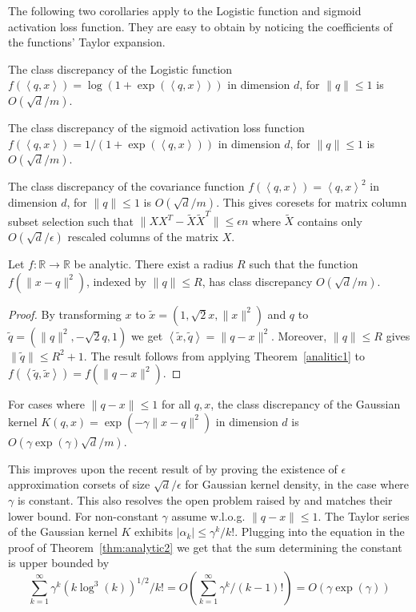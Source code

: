 \documentclass[12pt]{colt2019} %
\newcommand{\ip}[1]{\left \langle #1 \right \rangle}
\newcommand{\R}{\mathbb{R}}
\newcommand{\eps}{\epsilon}
\begin{document}
{The following two corollaries apply to the Logistic function and sigmoid activation loss function. They are easy to obtain by noticing the coefficients of the functions' Taylor expansion.

\begin{corollary}\label{cdlogistic}
The class discrepancy of the Logistic function $f(\ip{q,x}) = \log(1+\exp(\ip{q,x}))$ in dimension $d$, for $\|q\| \leq 1$ is $O(\sqrt{d}/m)$.
\end{corollary}
\begin{corollary}\label{cdsigmoid}
The class discrepancy of the sigmoid activation loss function $f(\ip{q,x}) = 1/(1+\exp(\ip{q,x}))$ in dimension $d$, for $\|q\| \leq 1$ is $O(\sqrt{d}/m)$.
\end{corollary}


\begin{corollary}
The class discrepancy of the covariance function $f(\ip{q,x}) = \ip{q,x}^2$ in dimension $d$, for $\|q\| \leq 1$ is $O(\sqrt{d}/m)$. This gives coresets for matrix column subset selection such that $\|XX^T - \tilde X \tilde X^T\| \le \eps n$ where $\tilde X$ contains only $O(\sqrt{d}/\eps)$ rescaled columns of the matrix $X$.
\end{corollary}



\begin{theorem} \label{thm:analytic2}
Let $f:\R\rightarrow\R$ be analytic. There exist a radius $R$ such that the function $f(\|x-q\|^2)$, indexed by $\|q\| \leq R$, has class discrepancy $O(\sqrt{d}/m)$. 
\end{theorem}
\begin{proof}
By transforming $x$ to $\tilde{x} = (1, \sqrt{2}x, \|x\|^2)$ and $q$ to $\tilde{q} = (\|q\|^2, -\sqrt{2}q, 1)$ we get $\ip{\tilde{x},\tilde{q}} = \|q-x\|^2$. Moreover, $\|q\| \le R$ gives $\|\tilde q\| \le R^2+1$. The result follows from applying Theorem~\ref{analitic1} to $f(\ip{ \tilde q, \tilde x}) = f(\|q-x\|^2)$.
\end{proof}

\begin{corollary}
For cases where $\|q-x\| \leq 1$ for all $q,x$, the class discrepancy of the Gaussian kernel $K(q,x) = \exp(-\gamma \|x-q\|^2)$ in dimension $d$ is $O(\gamma\exp(\gamma)\sqrt{d}/m)$.
\end{corollary} 
This improves upon the recent result of \cite{DBLP:journals/corr/abs-1802-01751} by proving the existence of $\eps$ approximation corsets of size $\sqrt{d}/\eps$ for Gaussian kernel density, in the case where $\gamma$ is constant. 
This also resolves the open problem raised by \cite{DBLP:journals/corr/abs-1802-01751} and matches their lower bound.   
For non-constant $\gamma$ assume w.l.o.g. $\|q-x\| \le 1$. The Taylor series of the Gaussian kernel $K$ exhibits $|\alpha_k| \le \gamma^k/k!$.
Plugging into the equation in the proof of Theorem~\ref{thm:analytic2} we get that the sum determining the constant is upper bounded by
$$\sum_{k=1}^\infty \gamma^{k}(k\log^3(k))^{1/2}/k! = O\left(\sum_{k=1}^\infty \gamma^{k}/(k-1)!\right) = O\left(\gamma \exp(\gamma)\right)$$


}
\end{document}
